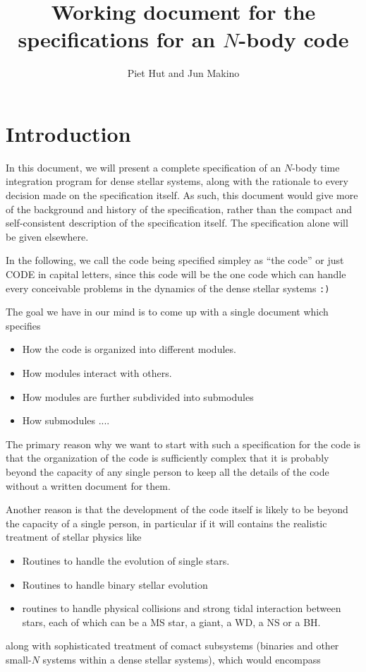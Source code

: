 \documentclass{article}[12pt]
\title{Working document for the specifications for an $N$-body code}
\author{Piet Hut and Jun Makino}
\begin{document}
\maketitle
\newpage
\tableofcontents
\newpage
\section{Introduction}

In this document, we will present a complete specification of an
$N$-body time integration program for dense stellar systems, along
with the rationale to every decision made on the specification
itself. As such, this document would give more of the background and
history of the specification, rather than the compact and
self-consistent description of the specification itself. The
specification alone will be given elsewhere.

In the following, we call the code being specified simpley as ``the
code'' or just CODE in capital letters, since this code will be the
one code which can handle every conceivable problems in the dynamics
of the dense stellar systems {\tt :)}

The goal we have in our mind is to come up with a single document
which specifies

\begin{itemize}
\item How the code is organized into different modules.
\item How  modules interact with others.
\item How modules are further subdivided into submodules
\item How submodules ....
\end{itemize}

The primary reason why we want to start with such a specification for
the code is that the organization of the code is sufficiently complex
that it is probably beyond the capacity of any single person to keep
all the details of the code without a written document for them.

Another reason is that  the development of the code itself is likely
to be beyond the capacity of a single person, in particular if it will
contains the realistic treatment of stellar physics like

\begin{itemize}
\item Routines to handle the evolution of single stars.
\item Routines to handle binary stellar evolution
\item routines to handle physical collisions and strong tidal
interaction between stars, each of which can be a MS star, a giant,
a WD, a NS or a BH.
\end{itemize}
along with sophisticated treatment of comact subsystems (binaries and
other small-$N$ systems within a dense stellar systems), which would
encompass
\end{document}
